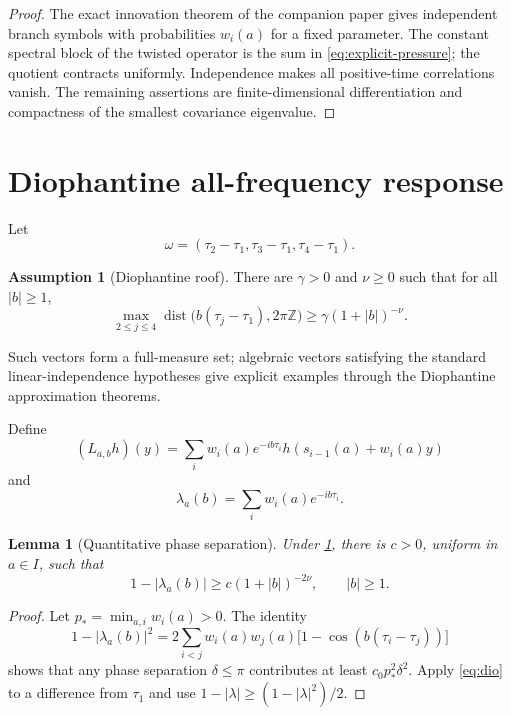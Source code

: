 \documentclass[11pt,reqno]{amsart}
\newtheorem{lemma}[theorem]{Lemma}
\theoremstyle{definition}
\newtheorem{assumption}[theorem]{Assumption}
\theoremstyle{remark}
\newcommand{\dist}{\operatorname{dist}}
\newcommand{\abs}[1]{\left\lvert #1\right\rvert}
\begin{document}
\begin{proof}
The exact innovation theorem of the companion paper gives independent branch
symbols with probabilities $w_i(a)$ for a fixed parameter.  The constant
spectral block of the twisted operator is the sum in
\eqref{eq:explicit-pressure}; the quotient contracts uniformly.  Independence
makes all positive-time correlations vanish.  The remaining assertions are
finite-dimensional differentiation and compactness of the smallest covariance
eigenvalue.
\end{proof}

\section{Diophantine all-frequency response}\label{sec:highfreq}

Let
\[
 \omega=(\tau_2-\tau_1,\tau_3-\tau_1,\tau_4-\tau_1).
\]

\begin{assumption}[Diophantine roof]\label{ass:diophantine}
There are $\gamma>0$ and $\nu\ge0$ such that for all $\abs b\ge1$,
\begin{equation}\label{eq:dio}
 \max_{2\le j\le4}
 \dist\bigl(b(\tau_j-\tau_1),2\pi\mathbb Z\bigr)
 \ge\gamma(1+\abs b)^{-\nu}.
\end{equation}
\end{assumption}

Such vectors form a full-measure set; algebraic vectors satisfying the standard
linear-independence hypotheses give explicit examples through the Diophantine
approximation theorems.

Define
\begin{equation}\label{eq:Lb}
 (L_{a,b}h)(y)=
 \sum_iw_i(a)e^{-ib\tau_i}
 h(s_{i-1}(a)+w_i(a)y)
\end{equation}
and
\[
 \lambda_a(b)=\sum_iw_i(a)e^{-ib\tau_i}.
\]

\begin{lemma}[Quantitative phase separation]\label{lem:phase}
Under \cref{ass:diophantine}, there is $c>0$, uniform in $a\in I$, such that
\begin{equation}\label{eq:lambda-separation}
 1-\abs{\lambda_a(b)}
 \ge c(1+\abs b)^{-2\nu},
 \qquad \abs b\ge1.
\end{equation}
\end{lemma}

\begin{proof}
Let $p_*=\min_{a,i}w_i(a)>0$.  The identity
\[
 1-\abs{\lambda_a(b)}^2
 =2\sum_{i<j}w_i(a)w_j(a)
 \bigl[1-\cos(b(\tau_i-\tau_j))\bigr]
\]
shows that any phase separation $\delta\le\pi$ contributes at least
$c_0p_*^2\delta^2$.  Apply \eqref{eq:dio} to a difference from $\tau_1$ and
use $1-\abs\lambda\ge(1-\abs\lambda^2)/2$.
\end{proof}
\end{document}
